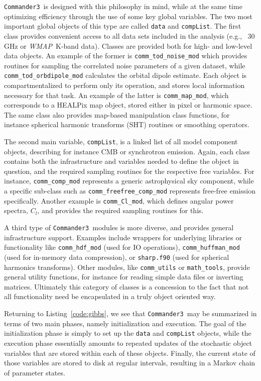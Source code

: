 \documentclass[twocolumn]{aa}
\def\WMAP{\emph{WMAP}}
\def\commanderthree{\texttt{Commander3}}
\begin{document}
\commanderthree\ is designed with this philosophy in mind, while at
the same time optimizing efficiency through the use of some key global
variables. The two most important global objects of this type are
called \texttt{data} and \texttt{compList}. The first class provides
convenient access to all data sets included in the analysis (e.g.,
\Planck\ 30\,GHz or \WMAP\ K-band data). Classes are provided both for
high- and low-level data objects. An example of the former is
\texttt{comm\_tod\_noise\_mod} which provides routines for sampling
the correlated noise parameters of a given dataset, while
\texttt{comm\_tod\_orbdipole\_mod} calculates the orbital dipole
estimate. Each object is compartmentalized to perform only its
operation, and stores local information necessary for that task. An
example of the latter is \texttt{comm\_map\_mod}, which corresponds to
a HEALPix map object, stored either in pixel or harmonic space. The
same class also provides map-based manipulation class
functions, for instance spherical harmonic transforms (SHT) routines
or smoothing operators.

The second main variable, \texttt{compList}, is a linked list of all
model component objects, describing for instance CMB or
synchrotron emission. Again, each class contains both the infrastructure and
variables needed to define the object in question, and the required
sampling routines for the respective free variables. For instance,
\texttt{comm\_comp\_mod} represents a generic astrophysical sky
component, while a specific sub-class such as
\texttt{comm\_freefree\_comp\_mod} represents free-free emission
specifically.  Another example is \texttt{comm\_Cl\_mod}, which
defines angular power spectra, $C_l$, and provides the required
sampling routines for this.

A third type of \commanderthree\ modules is more diverse, and provides
general infrastructure support. Examples include wrappers for
underlying libraries or functionality like \texttt{comm\_hdf\_mod}
(used for IO operations), \texttt{comm\_huffman\_mod} (used for
in-memory data compression), or \texttt{sharp.f90} (used for spherical
harmonics transforms). Other modules, like \texttt{comm\_utils} or
\texttt{math\_tools}, provide general utility functions, for instance
for reading simple data files or inverting matrices. Ultimately this
category of classes is a concession to the fact that not all
functionality need be encapsulated in a truly object oriented way. 

Returning to Listing~\ref{code:gibbs}, we see that \commanderthree\ may
be summarized in terms of two main phases, namely initialization and
execution. The goal of the initialization phase is simply to set up
the \texttt{data} and \texttt{compList} objects, while the execution
phase essentially amounts to repeated updates of the stochastic object
variables that are stored within each of these objects. Finally, the
current state of those variables are stored to disk at regular
intervals, resulting in a Markov chain of parameter states. 
\end{document}
